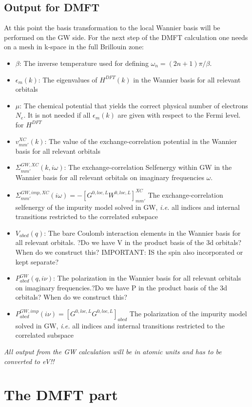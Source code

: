 \documentclass[12pt,a4paper]{scrartcl}
\numberwithin{equation}{section}
\newcommand{\cng}[1]{{\color{red}#1}}
\begin{document}
\subsection{Output for DMFT}
At this point the basis transformation to the local Wannier basis will be
performed on the GW side.
For the next step of the DMFT calculation one needs
on a mesh in k-space in the full Brillouin zone:
\begin{itemize}
\item $\beta$: The inverse temperature used for defining $\omega_n=(2n+1)\pi/\beta$.
\item $\epsilon_m(k)$: The eigenvalues  of $H^{DFT}(k)$ in the Wannier basis
for all relevant orbitals
\item $\mu$: The chemical potential that yields the correct physical number of electrons $N_e$. It is not needed if all $\epsilon_m(k)$ are given 
with respect to the Fermi level.
for $H^{DFT}$
\item $v^{XC}_{mm'}(k)$: The value of the exchange-correlation potential 
in the Wannier basis for all relevant orbitals
\item $\Sigma^{GW,XC}_{mm'}(k,i\omega)$: The exchange-correlation 
Selfenergy within GW in the Wannier basis for all relevant orbitals on imaginary frequencies $\omega$.
\item $\Sigma^{GW,imp,XC}_{mm'}(i\omega) = -[G^{0,loc,L}W^{0,loc,L}]^{XC}_{mm'}$
The exchange-correlation selfenergy of the impurity model solved in GW, \textit{i.e.}
all indices and internal transitions restricted to the correlated subspace
\item $V_{abcd}(q)$: The bare Coulomb interaction elements in the Wannier basis for all relevant orbitals.
\cng{?Do we have V in the product basis of the 3d orbitals? When do we construct this? IMPORTANT: IS the spin also incorporated or kept separate?}
\item $P^{GW}_{abcd}(q,i\nu)$: The polarization  in the Wannier basis for all relevant orbitals on imaginary frequencies.\cng{?Do we have P in the product basis of the 3d orbitals? When do we construct this?}
\item $P^{GW,imp}_{abcd}(i\nu) = [G^{0,loc,L}G^{0,loc,L}]_{abcd}$
The polarization of the impurity model solved in GW, \textit{i.e.}
all indices and internal transitions restricted to the correlated subspace
\end{itemize}
\textit{All output from the GW calculation will be in atomic units and
has to be converted to eV!!}


\section{The DMFT part}
\end{document}
